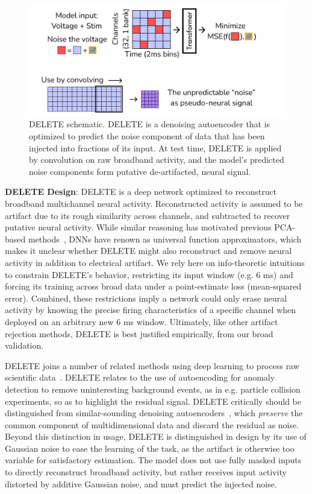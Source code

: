 \documentclass[12pt,oneside]{report}
\begin{document}
\begin{figure}[h]
  \centering
  \includegraphics[width=0.8\linewidth]{ch4_delete_schema.png}
  \caption{DELETE schematic. DELETE is a denoising autoencoder that is optimized to predict the noise component of data that has been injected into fractions of its input. At test time, DELETE is applied by convolution on raw broadband activity, and the model's predicted noise components form putative de-artifacted, neural signal.}
  \label{fig:delete_schema}
\end{figure}


\textbf{DELETE Design}: DELETE is a deep network optimized to reconstruct broadband multichannel neural activity. Reconstructed activity is assumed to be artifact due to its rough similarity across channels, and subtracted to recover putative neural activity. While similar reasoning has motivated previous PCA-based methods~\citep{oshea2018eraasr}, DNNs have renown as universal function approximators, which makes it unclear whether DELETE might also reconstruct and remove neural activity in addition to electrical artifact. We rely here on info-theoretic intuitions to constrain DELETE’s behavior, restricting its input window (e.g. 6 ms) and forcing its training across broad data under a point-estimate loss (mean-squared error). Combined, these restrictions imply a network could only erase neural activity by knowing the precise firing characteristics of a specific channel when deployed on an arbitrary new 6 ms window. Ultimately, like other artifact rejection methods, DELETE is best justified empirically, from our broad validation.

DELETE joins a number of related methods using deep learning to process raw scientific data~\citep{wang2023scientific}. DELETE relates to the use of autoencoding for anomaly detection to remove uninteresting background events, as in e.g. particle collision experiments, so as to highlight the residual signal. DELETE critically should be distinguished from similar-sounding denoising autoencoders~\citep{lecoq2021deepinterpolation,liu2025astro_denoise}, which \textit{preserve} the common component of multidimensional data and discard the residual as noise. Beyond this distinction in usage, DELETE is distinguished in design by its use of Gaussian noise to ease the learning of the task, as the artifact is otherwise too variable for satisfactory estimation. The model does not use fully masked inputs to directly reconstruct broadband activity, but rather receives input activity distorted by additive Gaussian noise, and must predict the injected noise.
\end{document}
